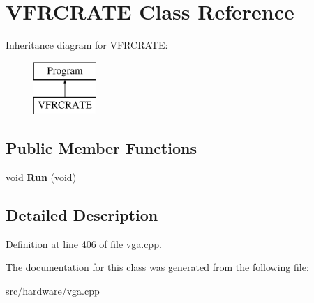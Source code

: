 \hypertarget{classVFRCRATE}{\section{V\-F\-R\-C\-R\-A\-T\-E Class Reference}
\label{classVFRCRATE}
}
Inheritance diagram for V\-F\-R\-C\-R\-A\-T\-E\-:\begin{figure}[H]
\begin{center}
\leavevmode
\includegraphics[height=2.000000cm]{classVFRCRATE}
\end{center}
\end{figure}
\subsection*{Public Member Functions}
\begin{DoxyCompactItemize}
\item 
\hypertarget{classVFRCRATE_ac9e54d65547f248ce6f97a91ebd73db2}{void {\bfseries Run} (void)}\label{classVFRCRATE_ac9e54d65547f248ce6f97a91ebd73db2}

\end{DoxyCompactItemize}


\subsection{Detailed Description}


Definition at line 406 of file vga.\-cpp.



The documentation for this class was generated from the following file\-:\begin{DoxyCompactItemize}
\item 
src/hardware/vga.\-cpp\end{DoxyCompactItemize}
